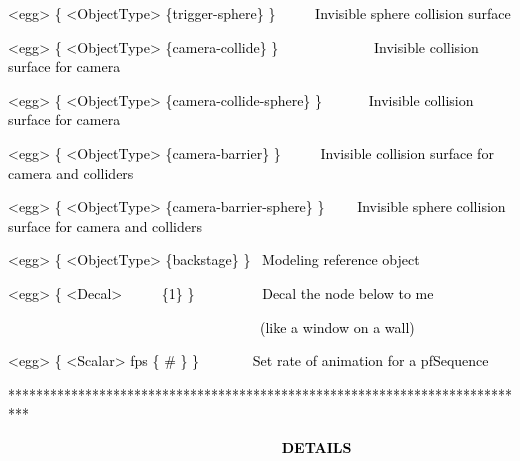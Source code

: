 \documentclass[a4paper]{article}
\newcommand\textstyleOOoComputerKeyWord[1]{\textrm{\textcolor[rgb]{0.0,0.0,0.5019608}{#1}}}
\begin{document}
{\color{black}
\textstyleOOoComputerKeyWord{\textcolor{black}{{\textless}egg{\textgreater} \{ {\textless}ObjectType{\textgreater}
\{trigger-sphere\} \} \ \ \ \ \ Invisible sphere collision surface}}}

{\color{black}
\textstyleOOoComputerKeyWord{\textcolor{black}{{\textless}egg{\textgreater} \{ {\textless}ObjectType{\textgreater}
\{camera-collide\} \} \ \ \ \ \ \ \ \ \ \ \ \ \ Invisible collision surface for camera}}}

{\color{black}
\textstyleOOoComputerKeyWord{\textcolor{black}{{\textless}egg{\textgreater} \{ {\textless}ObjectType{\textgreater}
\{camera-collide-sphere\} \} \ \ \ \ \ \ Invisible collision surface for camera}}}

{\color{black}
\textstyleOOoComputerKeyWord{\textcolor{black}{{\textless}egg{\textgreater} \{ {\textless}ObjectType{\textgreater}
\{camera-barrier\} \} \ \ \ \ \ Invisible collision surface for camera and colliders}}}

{\color{black}
\textstyleOOoComputerKeyWord{\textcolor{black}{{\textless}egg{\textgreater} \{ {\textless}ObjectType{\textgreater}
\{camera-barrier-sphere\} \} \ \ \ \ Invisible sphere collision surface for camera and colliders}}}

{\color{black}
\textstyleOOoComputerKeyWord{\textcolor{black}{{\textless}egg{\textgreater} \{ {\textless}ObjectType{\textgreater}
\{backstage\} \} \ Modeling reference object}}}

{\color{black}
\textstyleOOoComputerKeyWord{\textcolor{black}{{\textless}egg{\textgreater} \{ {\textless}Decal{\textgreater}
\ \ \ \ \ \{1\} \} \ \ \ \ \ \ \ \ \ Decal the node below to me }}}

{\color{black}
\textstyleOOoComputerKeyWord{\textcolor{black}{\ \ \ \ \ \ \ \ \ \ \ \ \ \ \ \ \ \ \ \ \ \ \ \ \ \ \ \ \ \ \ \ \ \ \ \ (like
a window on a wall)}}}

{\color{black}
\textstyleOOoComputerKeyWord{\textcolor{black}{{\textless}egg{\textgreater} \{ {\textless}Scalar{\textgreater} fps \{ \#
\} \} \ \ \ \ \ \ \ Set rate of animation for a pfSequence}}}


\bigskip


\bigskip

{\color{black}
\textstyleOOoComputerKeyWord{\textcolor{black}{***************************************************************************}}}

{\bfseries
\hypertarget{RefHeading7912869075401}{}\textstyleOOoComputerKeyWord{\textcolor{black}{\ \ \ \ \ \ \ \ \ \ \ \ \ \ \ \ \ \ \ \ \ \ \ \ \ \ \ \ \ \ \ \ \ \ DETAILS}}}
\end{document}
